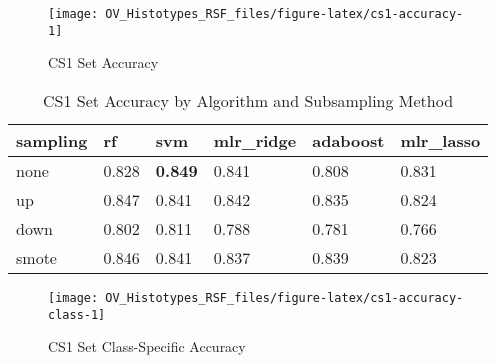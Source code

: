 \documentclass[
]{report}
\begin{document}
\begin{figure}[H]

{\centering \texttt{[image: OV\_Histotypes\_RSF\_files/figure-latex/cs1-accuracy-1]} 

}

\caption{CS1 Set Accuracy}\label{fig:cs1-accuracy}
\end{figure}

\begin{table}

\caption{\label{tab:cs1-accuracy-table}CS1 Set Accuracy by Algorithm and Subsampling Method}
\centering
\begin{tabular}[t]{l|l|l|l|l|l}
\hline
sampling & rf & svm & mlr\_ridge & adaboost & mlr\_lasso\\
\hline
none & 0.828 & \textbf{0.849} & 0.841 & 0.808 & 0.831\\
\hline
up & 0.847 & 0.841 & 0.842 & 0.835 & 0.824\\
\hline
down & 0.802 & 0.811 & 0.788 & 0.781 & 0.766\\
\hline
smote & 0.846 & 0.841 & 0.837 & 0.839 & 0.823\\
\hline
\end{tabular}
\end{table}

\begin{figure}[H]

{\centering \texttt{[image: OV\_Histotypes\_RSF\_files/figure-latex/cs1-accuracy-class-1]} 

}

\caption{CS1 Set Class-Specific Accuracy}\label{fig:cs1-accuracy-class}
\end{figure}
\end{document}

